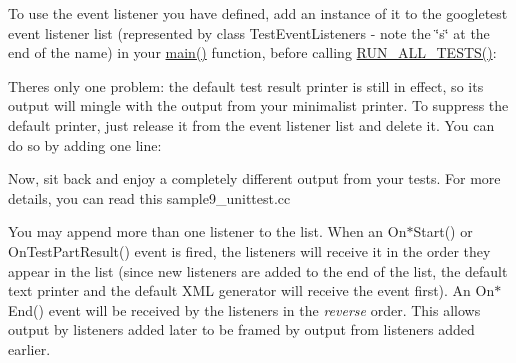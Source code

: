 To use the event listener you have defined, add an instance of it to the googletest event listener list (represented by class Test\+Event\+Listeners -\/ note the \char`\"{}s\char`\"{} at the end of the name) in your {\ttfamily \mbox{\hyperlink{_be_01vektoriaus_2main_8cpp_ae66f6b31b5ad750f1fe042a706a4e3d4}{main()}}} function, before calling {\ttfamily \mbox{\hyperlink{googletest-master_2googletest_2include_2gtest_2gtest_8h_a853a3792807489591d3d4a2f2ff9359f}{R\+U\+N\+\_\+\+A\+L\+L\+\_\+\+T\+E\+S\+T\+S()}}}\+:


\begin{DoxyCode}{0}
\DoxyCodeLine{\}}
\end{DoxyCode}


There\textquotesingle{}s only one problem\+: the default test result printer is still in effect, so its output will mingle with the output from your minimalist printer. To suppress the default printer, just release it from the event listener list and delete it. You can do so by adding one line\+:


\begin{DoxyCode}{0}
\end{DoxyCode}


Now, sit back and enjoy a completely different output from your tests. For more details, you can read this sample9\+\_\+unittest.\+cc

You may append more than one listener to the list. When an {\ttfamily On$\ast$\+Start()} or {\ttfamily On\+Test\+Part\+Result()} event is fired, the listeners will receive it in the order they appear in the list (since new listeners are added to the end of the list, the default text printer and the default X\+ML generator will receive the event first). An {\ttfamily On$\ast$\+End()} event will be received by the listeners in the {\itshape reverse} order. This allows output by listeners added later to be framed by output from listeners added earlier.

